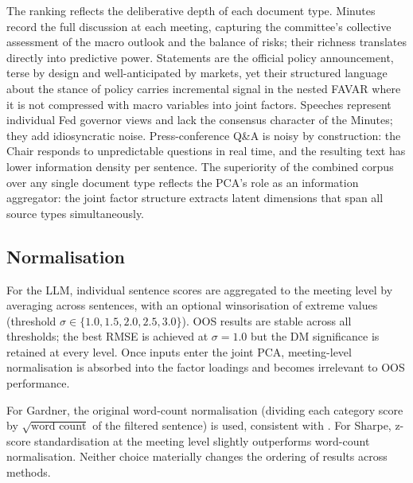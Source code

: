 The ranking reflects the deliberative depth of each document type. Minutes record the full discussion at each meeting, capturing the committee's collective assessment of the macro outlook and the balance of risks; their richness translates directly into predictive power. Statements are the official policy announcement, terse by design and well-anticipated by markets, yet their structured language about the stance of policy carries incremental signal in the nested FAVAR where it is not compressed with macro variables into joint factors. Speeches represent individual Fed governor views and lack the consensus character of the Minutes; they add idiosyncratic noise. Press-conference Q\&A is noisy by construction: the Chair responds to unpredictable questions in real time, and the resulting text has lower information density per sentence. The superiority of the combined corpus over any single document type reflects the PCA's role as an information aggregator: the joint factor structure extracts latent dimensions that span all source types simultaneously.


\subsection{Normalisation}\label{sec:normalisation}

For the LLM, individual sentence scores are aggregated to the meeting level by averaging across sentences, with an optional winsorisation of extreme values (threshold $\sigma \in \{1.0, 1.5, 2.0, 2.5, 3.0\}$). OOS results are stable across all thresholds; the best RMSE is achieved at $\sigma = 1.0$ but the DM significance is retained at every level. Once inputs enter the joint PCA, meeting-level normalisation is absorbed into the factor loadings and becomes irrelevant to OOS performance.

For Gardner, the original word-count normalisation (dividing each category score by $\sqrt{\text{word count}}$ of the filtered sentence) is used, consistent with \citet{gardner2022words}. For Sharpe, z-score standardisation at the meeting level slightly outperforms word-count normalisation. Neither choice materially changes the ordering of results across methods.


